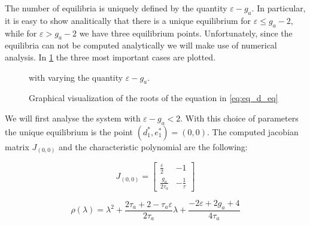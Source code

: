 The number of equilibria is uniquely defined by the quantity $\varepsilon-g_a$. In particular, it is easy to show analitically that there is a unique equilibrium for $\varepsilon \leq g_a-2$, while for $\varepsilon > g_a-2$ we have three equilibrium points. Unfortunately, since the equilibria can not be computed analytically we will make use of numerical analysis. In \cref{fig:eq2D_adapt} the three most important cases are plotted.

 \begin{figure}[!h]
        \caption{\label{fig:eq2D_adapt} Graphical visualization of the roots of the equation in \eqref{eq:eq_d_eq}} with varying the quantity $\varepsilon - g_a$.
\end{figure}

We will first analyse the system with $\varepsilon - g_a < 2$. With this choice of parameters the unique equilibrium is the point $(d_1^*,e_1^*)=(0, 0)$. The computed jacobian matrix $J_{(0,0)}$ and the characteristic polynomial are the following:

\begin{equation}
J_{(0, 0)} = \begin{bmatrix} 
\frac{\varepsilon}{2} & -1 \\
\frac{g_a}{2\tau_a} & -\frac{1}{\tau}
\end{bmatrix}
\end{equation}

\begin{equation}
\rho(\lambda) = \lambda^2 +  \frac{2\tau_a + 2 - \tau_a \varepsilon}{2\tau_a} \lambda + \frac{-2\varepsilon + 2g_a + 4}{4\tau_a}
\end{equation}

